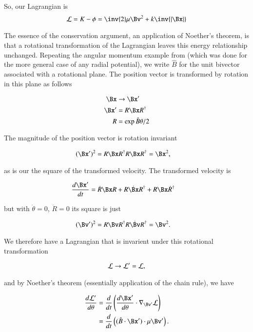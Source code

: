 \documentclass{article}
\begin{document}
So, our Lagrangian is
\begin{align*}
\LL = K - \phi = \inv{2} \mu \Bv^2 + k \inv{\Abs{\Bx}}
\end{align*}

The essence of the conservation argument, an application of 
Noether's theorem,
is that a rotational transformation of the Lagrangian leaves this energy relationship unchanged.  Repeating 
the angular momentum example from \cite{PJEulerLagrange} (which was done for the more general case of any radial potential), we 
write $\hat{B}$ for the unit bivector associated with a rotational plane.  The position vector is transformed by rotation in this plane as follows

\begin{align*}
\Bx &\rightarrow \Bx' \\
\Bx' &= R \Bx R^\dagger \\
R &= \exp{\hat{B}\theta/2}
\end{align*}

The magnitude of the position vector is rotation invariant

\begin{align*}
(\Bx')^2 &= R \Bx R^\dagger R \Bx R^\dagger = \Bx^2,
\end{align*}

as is our the square of the transformed velocity.  The transformed velocity is

\begin{align*}
\frac{d\Bx'}{dt} &= \dot{R} \Bx R + R \dot{\Bx} R^\dagger + R \Bx \dot{R}^\dagger
\end{align*}

but with $\dot{\theta} = 0$, $\dot{R} = 0$ its square is just

\begin{align*}
(\Bv')^2 &= R {\Bv} R^\dagger R \dot{\Bv} R^\dagger = \Bv^2.
\end{align*}

We therefore have a Lagrangian that is invarient under this rotational transformation

\begin{align*}
\mathcal{L} \rightarrow \mathcal{L}' = \mathcal{L},
\end{align*}

and by Noether's theorem (essentially application of the chain rule), we have

\begin{align*}
\frac{d\LL'}{d\theta}
&= \frac{d}{dt} \left(\frac{d\Bx'}{d\theta} \cdot \grad_{\Bv'} \LL \right) \\
&= \frac{d}{dt} \left( (\hat{B} \cdot \Bx') \cdot \mu \Bv' \right).
\end{align*}
\end{document}
